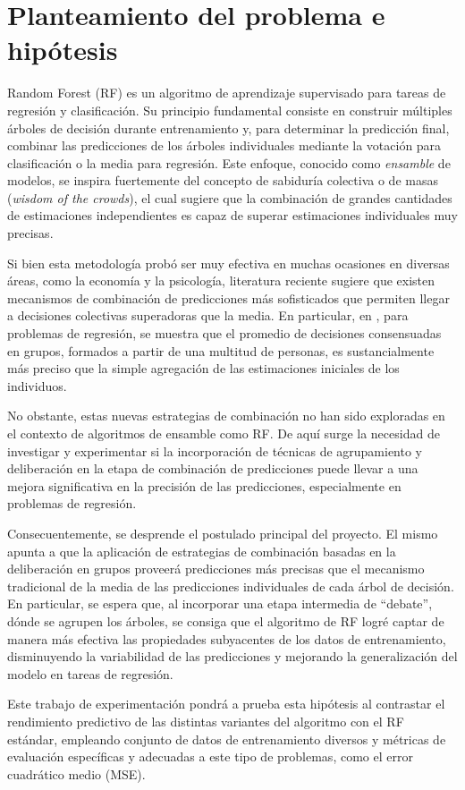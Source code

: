 %
\chapter{Planteamiento del problema e hipótesis}
\label{ch::capitulo4}

Random Forest (RF) es un algoritmo de aprendizaje supervisado para tareas de regresión y clasificación. Su principio fundamental consiste en construir múltiples árboles de decisión durante entrenamiento y, para determinar la predicción final, combinar las predicciones de los árboles individuales mediante la votación para clasificación o la media para regresión. Este enfoque, conocido como \textit{ensamble} de modelos, se inspira fuertemente del concepto de sabiduría colectiva o de masas (\textit{wisdom of the crowds}), el cual sugiere que la combinación de grandes cantidades de estimaciones independientes es capaz de superar estimaciones individuales muy precisas.

Si bien esta metodología probó ser muy efectiva en muchas ocasiones en diversas áreas, como la economía y la psicología, literatura reciente sugiere que existen mecanismos de combinación de predicciones más sofisticados que permiten llegar a decisiones colectivas superadoras que la media. En particular, en \cite{navajasAggregatedKnowledge}, para problemas de regresión, se muestra que el promedio de decisiones consensuadas en grupos, formados a partir de una multitud de personas, es sustancialmente más preciso que la simple agregación de las estimaciones iniciales de los individuos.

No obstante, estas nuevas estrategias de combinación no han sido exploradas en el contexto de algoritmos de ensamble como RF. De aquí surge la necesidad de investigar y experimentar si la incorporación de técnicas de agrupamiento y deliberación en la etapa de combinación de predicciones puede llevar a una mejora significativa en la precisión de las predicciones, especialmente en problemas de regresión.

Consecuentemente, se desprende el postulado principal del proyecto. El mismo apunta a que la aplicación de estrategias de combinación basadas en la deliberación en grupos proveerá predicciones más precisas que el mecanismo tradicional de la media de las predicciones individuales de cada árbol de decisión. En particular, se espera que, al incorporar una etapa intermedia de “debate”, dónde se agrupen los árboles, se consiga que el algoritmo de RF logré captar de manera más efectiva las propiedades subyacentes de los datos de entrenamiento, disminuyendo la variabilidad de las predicciones y mejorando la generalización del modelo en tareas de regresión.

Este trabajo de experimentación pondrá a prueba esta hipótesis al contrastar el rendimiento predictivo de las distintas variantes del algoritmo con el RF estándar, empleando conjunto de datos de entrenamiento diversos y métricas de evaluación específicas y adecuadas a este tipo de problemas, como el error cuadrático medio (MSE).